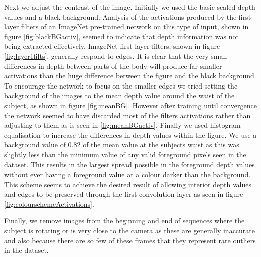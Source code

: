 \documentclass[11pt]{article} %
\begin{document}
Next we adjust the contrast of the image. Initially we used the basic scaled depth values and a black background. Analysis of the activations produced by the first layer filters of an ImageNet pre-trained network on this type of input, shown in figure \ref{fig:blackBGactiv}, seemed to indicate that depth information was not being extracted effectively. ImageNet first layer filters, shown in figure \ref{fig:layer1filts}, generally respond to edges. It is clear that the very small differences in depth between parts of the body will produce far smaller activations than the huge difference between the figure and the black background. To encourage the network to focus on the smaller edges we tried setting the background of the images to the mean depth value around the waist of the subject, as shown in figure \ref{fig:meanBG}. However after training until convergence the network seemed to have discarded most of the filters activations rather than adjusting to them as is seen in \ref{fig:meanBGactiv}. Finally we used histogram equalisation to increase the differences in depth values within the figure. We use a background value of 0.82 of the mean value at the subjects waist as this was slightly less than the minimum value of any valid foreground pixels seen in the dataset. This results in the largest spread possible in the foreground depth values without ever having a foreground value at a colour darker than the background. This scheme seems to achieve the desired result of allowing interior depth values and edges to be preserved through the first convolution layer as seen in figure \ref{fig:colourschemeActivations}.

Finally, we remove images from the beginning and end of sequences where the subject is rotating or is very close to the camera as these are generally inaccurate and also because there are so few of these frames that they represent rare outliers in the dataset. 
\end{document}
